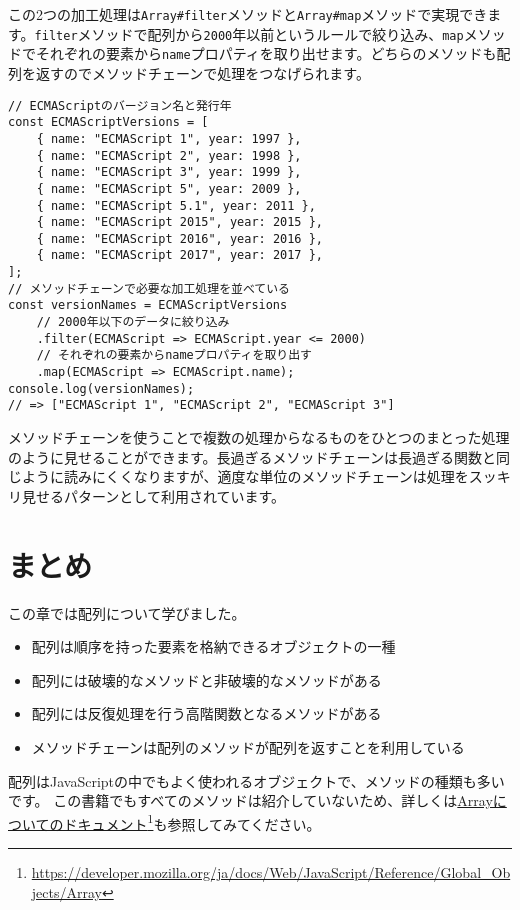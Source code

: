 この2つの加工処理は\texttt{Array\#filter}メソッドと\texttt{Array\#map}メソッドで実現できます。\texttt{filter}メソッドで配列から\texttt{2000}年以前というルールで絞り込み、\texttt{map}メソッドでそれぞれの要素から\texttt{name}プロパティを取り出せます。どちらのメソッドも配列を返すのでメソッドチェーンで処理をつなげられます。

\begin{lstlisting}
// ECMAScriptのバージョン名と発行年
const ECMAScriptVersions = [
    { name: "ECMAScript 1", year: 1997 },
    { name: "ECMAScript 2", year: 1998 },
    { name: "ECMAScript 3", year: 1999 },
    { name: "ECMAScript 5", year: 2009 },
    { name: "ECMAScript 5.1", year: 2011 },
    { name: "ECMAScript 2015", year: 2015 },
    { name: "ECMAScript 2016", year: 2016 },
    { name: "ECMAScript 2017", year: 2017 },
];
// メソッドチェーンで必要な加工処理を並べている
const versionNames = ECMAScriptVersions
    // 2000年以下のデータに絞り込み
    .filter(ECMAScript => ECMAScript.year <= 2000)
    // それぞれの要素からnameプロパティを取り出す
    .map(ECMAScript => ECMAScript.name);
console.log(versionNames); 
// => ["ECMAScript 1", "ECMAScript 2", "ECMAScript 3"]
\end{lstlisting}

メソッドチェーンを使うことで複数の処理からなるものをひとつのまとった処理のように見せることができます。長過ぎるメソッドチェーンは長過ぎる関数と同じように読みにくくなりますが、適度な単位のメソッドチェーンは処理をスッキリ見せるパターンとして利用されています。

\hypertarget{conclusion}{%
\section{まとめ}\label{conclusion}}

この章では配列について学びました。

\begin{itemize}
\item
  配列は順序を持った要素を格納できるオブジェクトの一種
\item
  配列には破壊的なメソッドと非破壊的なメソッドがある
\item
  配列には反復処理を行う高階関数となるメソッドがある
\item
  メソッドチェーンは配列のメソッドが配列を返すことを利用している
\end{itemize}

\enlargethispage{\baselineskip}配列はJavaScriptの中でもよく使われるオブジェクトで、メソッドの種類も多いです。
この書籍でもすべてのメソッドは紹介していないため、詳しくは\href{https://developer.mozilla.org/ja/docs/Web/JavaScript/Reference/Global_Objects/Array}{Arrayについてのドキュメント}\footnote{\url{https://developer.mozilla.org/ja/docs/Web/JavaScript/Reference/Global_Objects/Array}}も参照してみてください。
